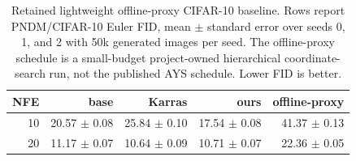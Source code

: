 \begin{table}[t]
  \centering
  \caption{Retained lightweight offline-proxy CIFAR-10 baseline.
  Rows report PNDM/CIFAR-10 Euler FID, mean $\pm$ standard error over
  seeds 0, 1, and 2 with 50k generated images per seed. The
  offline-proxy schedule is a small-budget project-owned hierarchical
  coordinate-search run, not the published AYS schedule. Lower FID is
  better.}
  \label{tab:cifar10-pndm-euler-50k-offline-proxy}
  \begin{tabular}{rrrrr}
    \toprule
    NFE & base & Karras & ours & offline-proxy \\
    \midrule
    10 & 20.57 $\pm$ 0.08 & 25.84 $\pm$ 0.10 & 17.54 $\pm$ 0.08 & 41.37 $\pm$ 0.13 \\
    20 & 11.17 $\pm$ 0.07 & 10.64 $\pm$ 0.09 & 10.71 $\pm$ 0.07 & 22.36 $\pm$ 0.05 \\
    \bottomrule
  \end{tabular}
\end{table}
